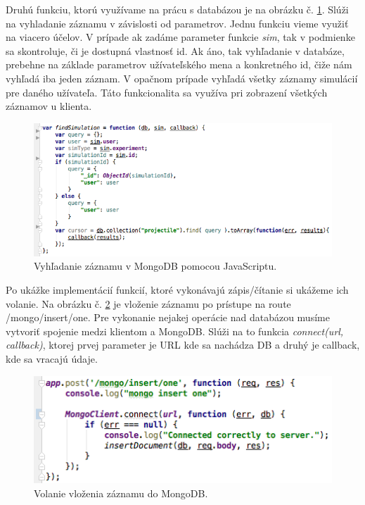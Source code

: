 Druhú funkciu, ktorú využívame na prácu s databázou je na obrázku č. \ref{img-express-mongodb-find}. Slúži na vyhladanie záznamu v závislosti od parametrov. Jednu funkciu vieme využiť na viacero účelov. V prípade ak zadáme parameter funkcie \textit{sim}, tak v podmienke sa skontroluje, či je dostupná vlastnosť id. Ak áno, tak vyhľadanie v databáze, prebehne na základe parametrov užívateľského mena a konkretného id, čiže nám vyhľadá iba jeden záznam. V opačnom prípade vyhľadá všetky záznamy simulácií pre daného užívateľa. Táto funkcionalita sa využíva pri zobrazení všetkých záznamov u klienta.

\begin{figure}[H]
  \centering
  \includegraphics[scale=0.7]{img/code/express-mongodb-find.png}
  \caption{Vyhľadanie záznamu v MongoDB pomocou JavaScriptu.}
  \label{img-express-mongodb-find}
\end{figure}

Po ukážke implementácií funkcií, ktoré vykonávajú zápis/čítanie si ukážeme ich volanie. Na obrázku č. \ref{img-express-mongodb-insert2} je vloženie záznamu po prístupe na route /mongo/insert/one. Pre vykonanie nejakej operácie nad databázou musíme vytvoriť spojenie medzi klientom a MongoDB. Slúži na to funkcia \textit{connect(url, callback)}, ktorej prvej parameter je URL kde sa nachádza DB a druhý je callback, kde sa vracajú údaje.

\begin{figure}[H]
  \centering
  \includegraphics[scale=0.7]{img/code/express-mongo-insert2.png}
  \caption{Volanie vloženia záznamu do MongoDB.}
  \label{img-express-mongodb-insert2}
\end{figure}

